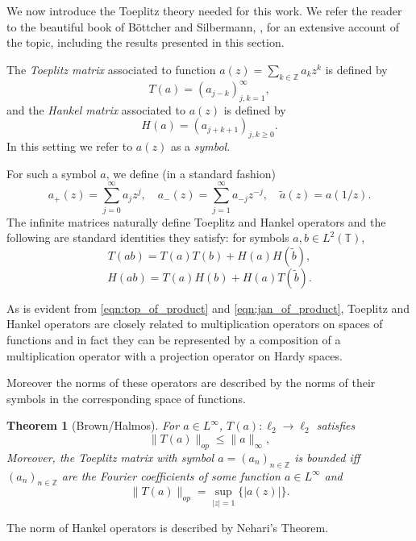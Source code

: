 \documentclass[11pt]{amsart}
\theoremstyle{plain}
\newtheorem{theorem}{Theorem}[section]
\theoremstyle{remark}
\numberwithin{equation}{section}
\begin{document}
We now introduce the Toeplitz theory needed for this work. We refer the reader to the beautiful book of B\"ottcher and Silbermann, \cite{BottSilb06}, for an extensive account of the topic, including the results presented in this section.


The \textit{Toeplitz matrix} associated to function $a(z)=\sum_{k\in \mathbb Z} a_kz^k$ is defined by
$$T(a)=(a_{j-k})_{j,k=1}^{\infty},$$
and the \textit{Hankel matrix} associated to $a(z)$ is defined by
$$H(a)=\left(a_{j+k+1}\right)_{j,k\geq 0}.$$
In this setting we refer to $a(z)$ as a \emph{symbol}. 

For such a symbol $a$, we define (in a standard fashion)
$$a_+(z)=\sum_{j=0}^{\infty}a_j z^j,\quad a_-(z)=\sum_{j=1}^{\infty}a_{-j}z^{-j},\quad \widetilde{a}(z)=a(1/z).$$
The infinite matrices naturally define Toeplitz and Hankel operators
and the following are standard identities they satisfy: for symbols $a,b\in L^2(\mathbb{T})$,
\begin{equation}\label{eqn:top_of_product}
T(ab)=T(a)T(b)+H(a)H(\widetilde{b}),
\end{equation}
\begin{equation}\label{eqn:jan_of_product}
H(ab)=T(a)H(b)+H(a)T(\widetilde{b}).
\end{equation}

As is evident from \eqref{eqn:top_of_product} and \eqref{eqn:jan_of_product},
Toeplitz and Hankel operators are closely related to multiplication operators on spaces of functions and in fact they can be represented by a composition of a multiplication operator with a projection operator on Hardy spaces. 

Moreover the norms of these operators are described by the norms of their symbols in the corresponding space of functions.

\begin{theorem}[Brown/Halmos]\label{thm:brown_halmos}
For $a\in L^{\infty}$,
$T(a): \ell_2\rightarrow \ell_2$ satisfies
\begin{equation}
\|T(a)\|_{op}\leq \|a\|_{\infty},
\end{equation}
Moreover, the Toeplitz matrix with symbol $a=(a_n)_{n\in\mathbb{Z}}$ is bounded iff $(a_n)_{n\in\mathbb{Z}}$ are the Fourier coefficients of some function $a\in L^{\infty}$ and
\begin{equation}
\|T(a)\|_{op}= \sup_{|z|=1} \{|a(z)|\}.
\end{equation}
\end{theorem}

The norm of Hankel operators is described by Nehari's Theorem. 
\end{document}
